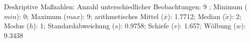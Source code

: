 				\label{tableValues:pfec37}
				\vspace*{-\baselineskip}
                    \begin{noten}
                	    \note{} Deskriptive Maßzahlen:
                	    Anzahl unterschiedlicher Beobachtungen: 9%
                	    ; 
                	      Minimum ($min$): 0; 
                	      Maximum ($max$): 9; 
                	      arithmetisches Mittel ($\bar{x}$): \num[round-mode=places,round-precision=2]{1.7712}; 
                	      Median ($\tilde{x}$): 2; 
                	      Modus ($h$): 1; 
                	      Standardabweichung ($s$): \num[round-mode=places,round-precision=2]{0.9758}; 
                	      Schiefe ($v$): \num[round-mode=places,round-precision=2]{1.657}; 
                	      Wölbung ($w$): \num[round-mode=places,round-precision=2]{9.3438}
                     \end{noten}

